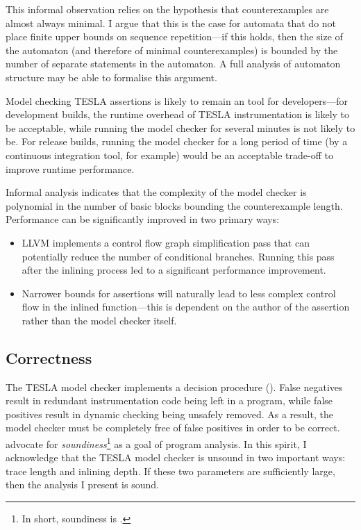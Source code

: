 This informal observation relies on the hypothesis that counterexamples are
almost always minimal. I argue that this is the case for automata that do not
place finite upper bounds on sequence repetition---if this holds, then the size
of the automaton (and therefore of minimal counterexamples) is bounded by the
number of separate statements in the automaton. A full analysis of automaton
structure may be able to formalise this argument.

Model checking TESLA assertions is likely to remain an  tool
for developers---for development builds, the runtime overhead of TESLA
instrumentation is likely to be acceptable, while running the model checker for
several minutes is not likely to be. For release builds, running the model
checker for a long period of time (by a continuous integration tool, for
example) would be an acceptable trade-off to improve runtime performance.

Informal analysis indicates that the complexity of the model checker is
polynomial in the number of basic blocks bounding the counterexample length.
Performance can be significantly improved in two primary ways:
\begin{itemize}
  \item LLVM implements a control flow graph simplification pass that can
    potentially reduce the number of conditional branches. Running this pass
    after the inlining process led to a significant performance improvement.
  \item Narrower bounds for assertions will naturally lead to less complex
    control flow in the inlined function---this is dependent on the author of
    the assertion rather than the model checker itself.
\end{itemize}

\subsection{Correctness}

The TESLA model checker implements a decision procedure (). False negatives result in redundant
instrumentation code being left in a program, while false positives result in
dynamic checking being unsafely removed. As a result, the model checker must be
completely free of false positives in order to be correct.
\textcite{livshits_defense_2015} advocate for \emph{soundiness}\footnote{In
short, soundiness is .} as
a goal of program analysis. In this spirit, I acknowledge that the TESLA model
checker is unsound in two important ways: trace length and inlining depth. If
these two parameters are sufficiently large, then the analysis I present is
sound.

